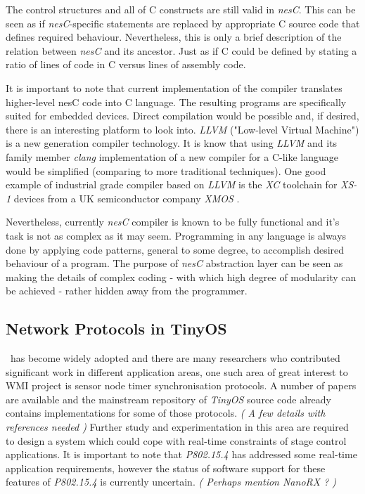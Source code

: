   The control structures and all of C constructs are still valid in
 \emph{nesC}. This can be seen as if \emph{nesC}-specific statements
 are replaced by appropriate C source code that defines required behaviour.
 Nevertheless, this is only a brief description of the relation between
 \emph{nesC} and its ancestor. Just as if C could be defined by stating
 a ratio of lines of code in C versus lines of assembly code.

 It is important to note that current implementation of the compiler
 translates higher-level nesC code into C language. The resulting
 programs are specifically suited for embedded devices. Direct
 compilation would be possible and, if desired, there is an interesting
 platform to look into. \emph{LLVM} ("Low-level Virtual Machine") is a
 new generation compiler technology. It is know that using \emph{LLVM}
 and its family member \emph{clang} implementation of a new compiler
 for a C-like language would be simplified (comparing to more traditional
 techniques). One good example of industrial grade compiler based on
 \emph{LLVM} is the \emph{XC} toolchain for \emph{XS-1} devices from
 a UK semiconductor company \emph{XMOS} \cite{paper:xmos:docs:xcc}.

 Nevertheless, currently \emph{nesC} compiler is known to be fully
 functional and it's task is not as complex as it may seem. Programming
 in any language is always done by applying code patterns, general
 to some degree, to accomplish desired behaviour of a program.
 The purpose of \emph{nesC} abstraction layer can be seen as making
 the details of complex coding - with which high degree of modularity
 can be achieved - rather hidden away from the programmer.


\subsection{Network Protocols in TinyOS}
 
  \TinyOS\ has become widely adopted and there are many researchers
 who contributed significant work in different application areas, one
 such area of great interest to WMI project is sensor node timer
 synchronisation protocols. A number of papers are available and the
 mainstream repository of \emph{TinyOS} source code already contains
 implementations for some of those protocols.
 \emph{( A few details with references needed )}
  Further study and experimentation in this area are required to design
 a system which could cope with real-time constraints of stage control
 applications. It is important to note that \emph{P802.15.4} has addressed
 some real-time application requirements, however the status of software
 support for these features of \emph{P802.15.4} is currently uncertain.
 \emph{( Perhaps mention NanoRX ? )}

